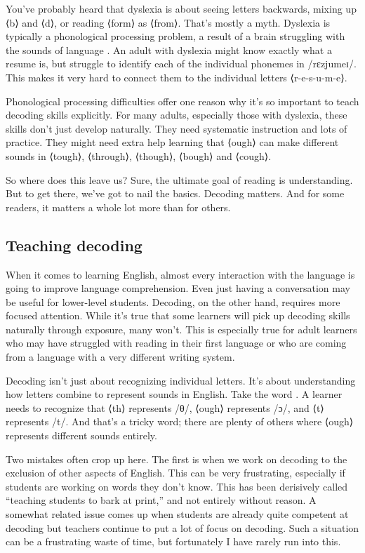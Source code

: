 \bigskip

You've probably heard that dyslexia is about seeing letters backwards, mixing up ⟨b⟩ and ⟨d⟩, or reading ⟨form⟩ as ⟨from⟩. That's mostly a myth. Dyslexia is typically a phonological processing problem, a result of a brain struggling with the sounds of language \citep{lyon2003definition}. An adult with dyslexia might know exactly what a resume is, but struggle to identify each of the individual phonemes in /rɛzjumeɪ/. This makes it very hard to connect them to the individual letters ⟨r-e-s-u-m-e⟩.

Phonological processing difficulties offer one reason why it's so important to teach decoding skills explicitly. For many adults, especially those with dyslexia, these skills don't just develop naturally. They need systematic instruction and lots of practice. They might need extra help learning that ⟨ough⟩ can make different sounds in ⟨tough⟩, ⟨through⟩, ⟨though⟩, ⟨bough⟩ and ⟨cough⟩.

So where does this leave us? Sure, the ultimate goal of reading is understanding. But to get there, we've got to nail the basics. Decoding matters. And for some readers, it matters a whole lot more than for others.

\subsection{Teaching decoding}

When it comes to learning English, almost every interaction with the language is going to improve language comprehension. Even just having a conversation may be useful for lower-level students. Decoding, on the other hand, requires more focused attention. While it's true that some learners will pick up decoding skills naturally through exposure, many won't. This is especially true for adult learners who may have struggled with reading in their first language or who are coming from a language with a very different writing system.

Decoding isn't just about recognizing individual letters. It's about understanding how letters combine to represent sounds in English. Take the word . A learner needs to recognize that ⟨th⟩ represents /θ/, ⟨ough⟩ represents /ɔ/, and ⟨t⟩ represents /t/. And that's a tricky word; there are plenty of others where ⟨ough⟩ represents different sounds entirely.

Two mistakes often crop up here. The first is when we work on decoding to the exclusion of other aspects of English. This can be very frustrating, especially if students are working on words they don't know. This has been derisively called \enquote{teaching students to bark at print,} and not entirely without reason. A somewhat related issue comes up  when students are already quite competent at decoding but teachers continue to put a lot of focus on decoding. Such a situation can be a frustrating waste of time, but fortunately I have rarely run into this.

